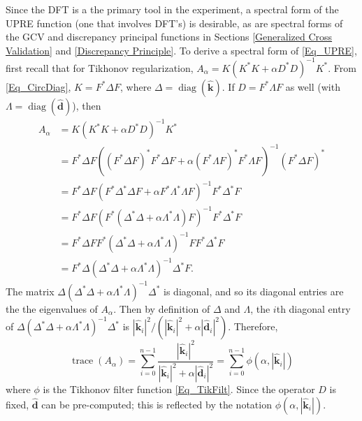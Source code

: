 \documentclass[12pt]{article}
\newcommand{\kdis}{\mathbf{k}}
\newcommand{\kmat}{K}	%
\newcommand{\ddis}{\mathbf{d}}	%
\newcommand{\ctrans}{*}	%
\newcommand{\trace}{\operatorname{trace}}	%
\newcommand{\diag}{\operatorname{diag}}
\newcommand{\regparam}{\alpha}
\newcommand{\filt}{\phi}
\newcommand{\A}{A_{\regparam}}	%
\begin{document}
Since the DFT is a the primary tool in the experiment, a spectral form of the UPRE function (one that involves DFT's) is desirable, as are spectral forms of the GCV and discrepancy principal functions in Sections \ref{Generalized Cross Validation} and \ref{Discrepancy Principle}. To derive a spectral form of \eqref{Eq_UPRE}, first recall that for Tikhonov regularization, $\A = \kmat(\kmat^\ctrans\kmat + \regparam{D^\ctrans}D)^{-1}\kmat^\ctrans$. From \eqref{Eq_CircDiag}, $\kmat = F^*\Delta{F}$, where $\Delta = \diag(\widehat{\kdis})$. If $D = F^\ctrans\Lambda{F}$ as well (with $\Lambda = \diag(\widehat{\ddis})$), then
\begin{align*}
\A &= \kmat(\kmat^\ctrans\kmat + \regparam{D^\ctrans}D)^{-1}\kmat^\ctrans \\
&= F^*\Delta{F}((F^*\Delta{F})^\ctrans F^\ctrans\Delta{F} + \regparam(F^\ctrans\Lambda{F})^\ctrans F^\ctrans\Lambda{F})^{-1}(F^*\Delta{F})^\ctrans \\
&= F^\ctrans\Delta{F}(F^\ctrans\Delta^\ctrans\Delta{F} + \regparam{F^\ctrans\Lambda^\ctrans\Lambda{F}})^{-1}F^\ctrans\Delta^\ctrans{F} \\
&= F^\ctrans\Delta{F}(F^\ctrans(\Delta^\ctrans\Delta + \regparam\Lambda^\ctrans\Lambda)F)^{-1}F^\ctrans\Delta^\ctrans{F} \\
&= F^\ctrans\Delta{F}F^\ctrans(\Delta^\ctrans\Delta + \regparam\Lambda^\ctrans\Lambda)^{-1}FF^\ctrans\Delta^\ctrans{F} \\
&= F^\ctrans\Delta(\Delta^\ctrans\Delta + \regparam\Lambda^\ctrans\Lambda)^{-1}\Delta^\ctrans{F}.
\end{align*}
The matrix $\Delta(\Delta^\ctrans\Delta + \regparam\Lambda^\ctrans\Lambda)^{-1}\Delta^\ctrans$ is diagonal, and so its diagonal entries are the the eigenvalues of $\A$. Then by definition of $\Delta$ and $\Lambda$, the $i$th diagonal entry of $\Delta(\Delta^\ctrans\Delta + \regparam\Lambda^\ctrans\Lambda)^{-1}\Delta^\ctrans$ is $|\widehat{\kdis}_i|^2/(|\widehat{\kdis}_i|^2 + \regparam|\widehat{\ddis}_i|^2)$. Therefore,
\begin{equation}
\trace(\A) = \sum_{i = 0}^{n-1} \frac{|\widehat{\kdis}_i|^2}{|\widehat{\kdis}_i|^2 + \regparam|\widehat{\ddis}_i|^2} = \sum_{i = 0}^{n-1} \filt(\regparam,|\widehat{\kdis}_i|)
\label{Eq_TraceUPRE}
\end{equation}
where $\filt$ is the Tikhonov filter function \eqref{Eq_TikFilt}. Since the operator $D$ is fixed, $\widehat{\ddis}$ can be pre-computed; this is reflected by the notation $\filt(\regparam,|\widehat{\kdis}_i|)$. \par
\end{document}
